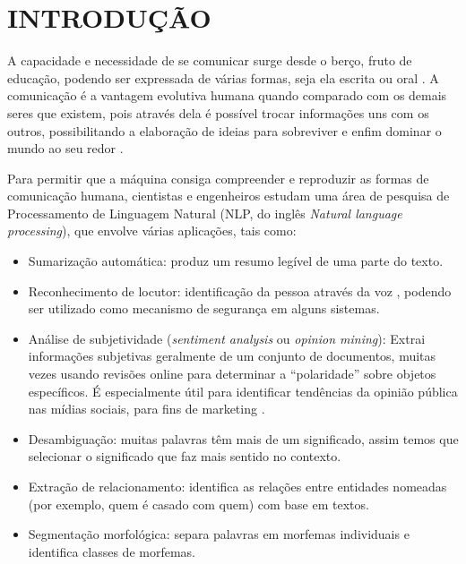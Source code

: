 
\chapter[INTRODUÇÃO]{INTRODUÇÃO}

A capacidade e necessidade de se comunicar surge desde o berço, fruto de educação, podendo ser expressada de várias formas, seja ela escrita ou  oral \cite{falcao2014leitura}. A comunicação é a vantagem evolutiva humana quando comparado com os demais seres que existem, pois através dela é possível trocar informações uns com os outros, possibilitando a elaboração de ideias para sobreviver e enfim dominar o mundo ao seu redor \cite{dos2018importancia}.  

Para permitir que a máquina consiga compreender e reproduzir as formas de comunicação humana, cientistas e engenheiros estudam uma área de
pesquisa de Processamento de Linguagem Natural (NLP, do inglês \textit{Natural language processing}), que envolve várias aplicações, tais como:
\begin{itemize}
    \item Sumarização automática: produz um resumo legível de uma parte do texto. 
    \item Reconhecimento de locutor: identificação da pessoa através da voz \cite{campbell1997speaker}, podendo ser utilizado como mecanismo de segurança em alguns sistemas.
    \item Análise de subjetividade (\textit{sentiment analysis} ou \textit{opinion mining}): Extrai informações subjetivas geralmente de um conjunto de documentos, muitas vezes usando revisões online para determinar a ``polaridade'' sobre objetos específicos. É especialmente útil para identificar tendências da opinião pública nas mídias sociais, para fins de marketing \cite{ding2014sibgrapi}.
    \item Desambiguação: muitas palavras têm mais de um significado, assim temos que selecionar o significado que faz mais sentido no contexto.
    \item Extração de relacionamento: identifica as relações entre entidades nomeadas (por exemplo, quem é casado com quem) com base em textos.
    \item Segmentação morfológica: separa palavras em morfemas individuais e identifica classes de morfemas.
\end{itemize}

